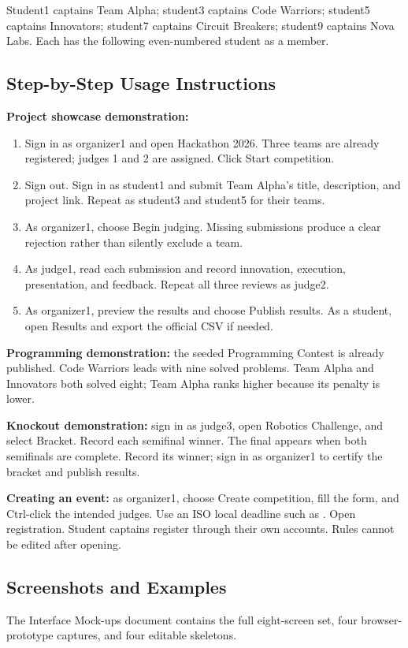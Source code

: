 Student1 captains Team Alpha; student3 captains Code Warriors; student5 captains Innovators; student7 captains Circuit Breakers; student9 captains Nova Labs. Each has the following even-numbered student as a member.
\subsection{Step-by-Step Usage Instructions}
\textbf{Project showcase demonstration:}
\begin{enumerate}
\item Sign in as organizer1 and open Hackathon 2026. Three teams are already registered; judges 1 and 2 are assigned. Click Start competition.
\item Sign out. Sign in as student1 and submit Team Alpha's title, description, and project link. Repeat as student3 and student5 for their teams.
\item As organizer1, choose Begin judging. Missing submissions produce a clear rejection rather than silently exclude a team.
\item As judge1, read each submission and record innovation, execution, presentation, and feedback. Repeat all three reviews as judge2.
\item As organizer1, preview the results and choose Publish results. As a student, open Results and export the official CSV if needed.
\end{enumerate}
\textbf{Programming demonstration:} the seeded Programming Contest is already published. Code Warriors leads with nine solved problems. Team Alpha and Innovators both solved eight; Team Alpha ranks higher because its penalty is lower.

\textbf{Knockout demonstration:} sign in as judge3, open Robotics Challenge, and select Bracket. Record each semifinal winner. The final appears when both semifinals are complete. Record its winner; sign in as organizer1 to certify the bracket and publish results.

\textbf{Creating an event:} as organizer1, choose Create competition, fill the form, and Ctrl-click the intended judges. Use an ISO local deadline such as . Open registration. Student captains register through their own accounts. Rules cannot be edited after opening.
\clearpage\subsection{Screenshots and Examples}
The Interface Mock-ups document contains the full eight-screen set, four browser-prototype captures, and four editable skeletons.
